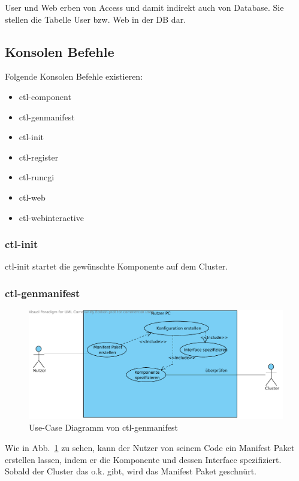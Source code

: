 User und Web erben von Access und damit indirekt auch von Database.
Sie stellen die Tabelle User bzw. Web in der DB dar.

\subsection{Konsolen Befehle}
Folgende Konsolen Befehle existieren:
\begin{itemize}
  \item ctl-component
  \item ctl-genmanifest
  \item ctl-init
  \item ctl-register
  \item ctl-runcgi
  \item ctl-web
  \item ctl-webinteractive
\end{itemize}

\subsubsection{ctl-init}
ctl-init startet die gewünschte Komponente auf dem Cluster.

\subsubsection{ctl-genmanifest}
\begin{figure}[H]
  \begin{center}
	\includegraphics[scale=0.7]{bilder/ctl-genmanifest_usecase.pdf}
	\caption{Use-Case Diagramm von ctl-genmanifest}
	\label{g_ctl-genmanifest_uc}
  \end{center}
\end{figure}
Wie in Abb.\ \ref{g_ctl-genmanifest_uc} zu sehen, kann der Nutzer von seinem
Code ein Manifest Paket erstellen lassen, indem er die Komponente und dessen
Interface spezifiziert. Sobald der Cluster das o.k. gibt, wird das Manifest
Paket geschnürt.

